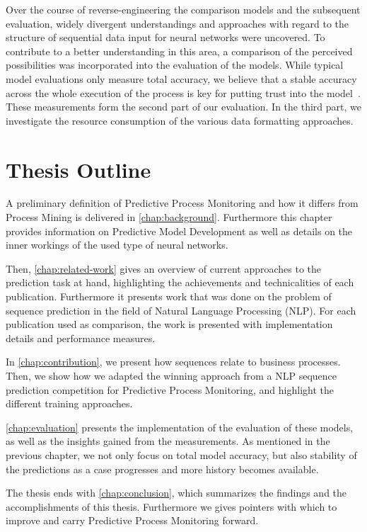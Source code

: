 Over the course of reverse-engineering the comparison models and the subsequent evaluation, widely divergent understandings and approaches with regard to the structure of sequential data input for neural networks were uncovered. To contribute to a better understanding in this area, a comparison of the perceived possibilities was incorporated into the evaluation of the models. While typical model evaluations only measure total accuracy, we believe that a stable accuracy across the whole execution of the process is key for putting trust into the model~\cite{francescomarino2015, boehmer2018probability}. These measurements form the second part of our evaluation. In the third part, we investigate the resource consumption of the various data formatting approaches.

\section{Thesis Outline}\label{sec:intro:outline}
A preliminary definition of Predictive Process Monitoring and how it differs from Process Mining is delivered in \autoref{chap:background}. Furthermore this chapter provides information on Predictive Model Development as well as details on the inner workings of the used type of neural networks.

Then, \autoref{chap:related-work} gives an overview of current approaches to the prediction task at hand, highlighting the achievements and technicalities of each publication. Furthermore it presents work that was done on the problem of sequence prediction in the field of Natural Language Processing (NLP). For each publication used as comparison, the work is presented with implementation details and performance measures.

In \autoref{chap:contribution}, we present how sequences relate to business processes. Then, we show how we adapted the winning approach from a NLP sequence prediction competition for Predictive Process Monitoring, and highlight the different training approaches.

\autoref{chap:evaluation} presents the implementation of the evaluation of these models, as well as the insights gained from the measurements. As mentioned in the previous chapter, we not only focus on total model accuracy, but also stability of the predictions as a case progresses and more history becomes available.

The thesis ends with \autoref{chap:conclusion}, which summarizes the findings and the accomplishments of this thesis. Furthermore we gives pointers with which to improve and carry Predictive Process Monitoring forward.